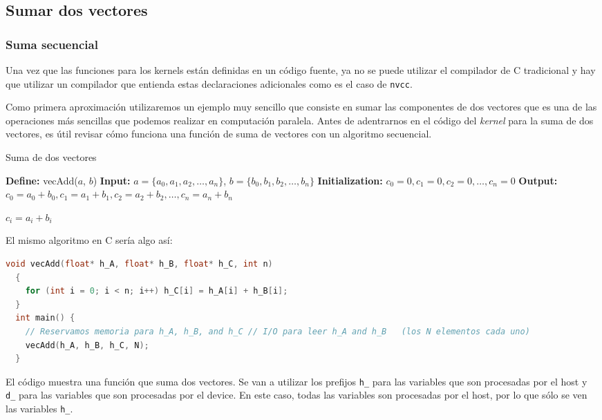 \subsection{Sumar dos vectores}

\subsubsection{Suma secuencial}

Una vez que las funciones para los kernels están definidas en un código fuente, ya no se puede utilizar el compilador de
C tradicional y hay que utilizar un compilador que entienda estas declaraciones adicionales como es el caso de
\texttt{nvcc}.

Como primera aproximación utilizaremos un ejemplo muy sencillo que consiste en sumar las componentes de dos vectores que
es una de las operaciones más sencillas que podemos realizar en computación paralela. Antes de adentrarnos en el código
del \textit{kernel} para la suma de dos vectores, es útil revisar cómo funciona una función de suma de vectores con un
algoritmo secuencial.

\begin{algorithm}
\caption{Suma de dos vectores}
  \begin{algorithmic}[1]
  \Statex \textbf{Define:} vecAdd($a$, $b$)
  \Statex \textbf{Input:} $a = \{a_0, a_1, a_2, \ldots, a_n\}$, $b = \{b_0, b_1, b_2, \ldots, b_n\}$
  \Statex \textbf{Initialization:} $c_0 = 0, c_1 = 0, c_2 = 0, \ldots, c_n = 0$
  \Statex \textbf{Output:} $c_0 = a_0 + b_0, c_1 = a_1 + b_1, c_2 = a_2 + b_2, \ldots, c_n = a_n + b_n$

    \State $c_i = a_i + b_i$
  \EndFor
  \end{algorithmic}
\end{algorithm}

\newpage

El mismo algoritmo en C sería algo así:

\begin{lstlisting}[language=C]
  void vecAdd(float* h_A, float* h_B, float* h_C, int n)
  {
    for (int i = 0; i < n; i++) h_C[i] = h_A[i] + h_B[i];
  }
  int main() {
    // Reservamos memoria para h_A, h_B, and h_C // I/O para leer h_A and h_B   (los N elementos cada uno)
    vecAdd(h_A, h_B, h_C, N);
  }
\end{lstlisting}

El código muestra una función que suma dos vectores. Se van a utilizar los prefijos \texttt{h\_} para las variables que
son procesadas por el host y \texttt{d\_} para las variables que son procesadas por el device. En este caso, todas las
variables son procesadas por el host, por lo que sólo se ven las variables \texttt{h\_}.

